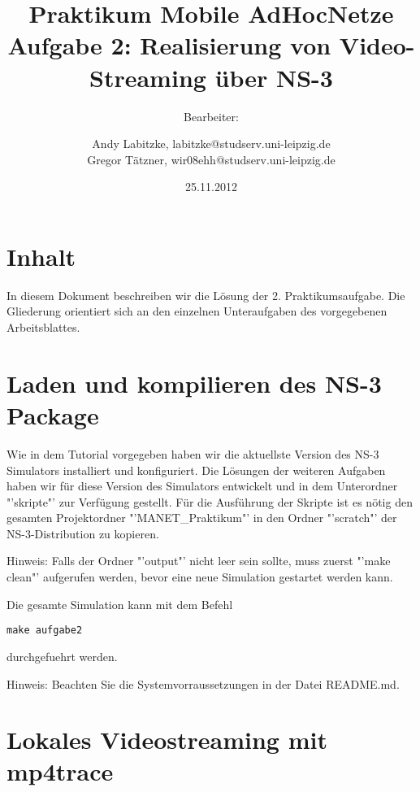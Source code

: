 \documentclass[12pt,a4paper,titlepage]{article}
\begin{document}
\title{Praktikum Mobile AdHocNetze\\
	Aufgabe 2: Realisierung von Video-Streaming über NS-3}
\author{
Bearbeiter: \and
	Andy Labitzke, labitzke@studserv.uni-leipzig.de \\ 
	Gregor Tätzner, wir08ehh@studserv.uni-leipzig.de}
\date{25.11.2012}
\maketitle
\setcounter{page}{1}
\appendix

\section*{Inhalt}
In diesem Dokument beschreiben wir die Lösung der 2. Praktikumsaufgabe. Die Gliederung orientiert sich an den einzelnen Unteraufgaben des vorgegebenen Arbeitsblattes.

\setcounter{section}{0}

\section{Laden und kompilieren des NS-3 Package}

Wie in dem Tutorial vorgegeben haben wir die aktuellste Version des NS-3 Simulators installiert und konfiguriert. Die Lösungen der weiteren Aufgaben haben wir für diese Version des Simulators entwickelt und in dem Unterordner "'skripte"' zur Verfügung gestellt. Für die Ausführung der Skripte ist es nötig den gesamten Projektordner "'MANET\_Praktikum"' in den Ordner "'scratch"' der NS-3-Distribution zu kopieren.

\begin{center}
Hinweis: Falls der Ordner "'output"' nicht leer sein sollte, muss zuerst "'make clean"' aufgerufen werden, bevor eine neue Simulation gestartet werden kann.
\end{center}

Die gesamte Simulation kann mit dem Befehl
\begin{lstlisting}
make aufgabe2
\end{lstlisting}
durchgefuehrt werden.

\begin{center}
Hinweis: Beachten Sie die Systemvorraussetzungen in der Datei README.md.
\end{center}

\section{Lokales Videostreaming mit mp4trace}
\end{document}
